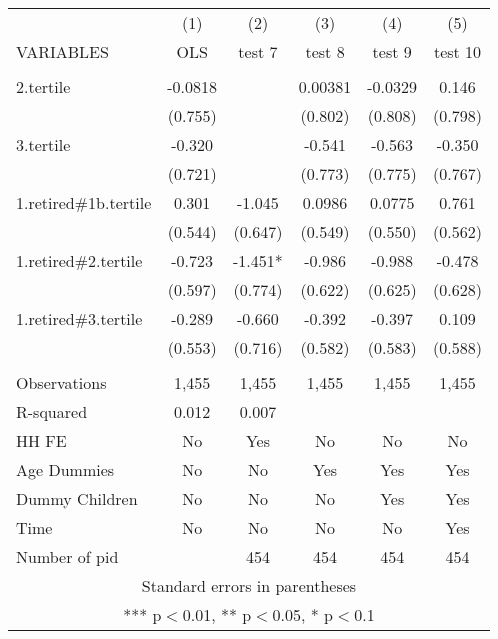 \begin{tabular}{lccccc} \hline
 & (1) & (2) & (3) & (4) & (5) \\
VARIABLES & OLS & test 7 & test 8 & test 9 & test 10 \\ \hline
 &  &  &  &  &  \\
2.tertile & -0.0818 &  & 0.00381 & -0.0329 & 0.146 \\
 & (0.755) &  & (0.802) & (0.808) & (0.798) \\
3.tertile & -0.320 &  & -0.541 & -0.563 & -0.350 \\
 & (0.721) &  & (0.773) & (0.775) & (0.767) \\
1.retired\#1b.tertile & 0.301 & -1.045 & 0.0986 & 0.0775 & 0.761 \\
 & (0.544) & (0.647) & (0.549) & (0.550) & (0.562) \\
1.retired\#2.tertile & -0.723 & -1.451* & -0.986 & -0.988 & -0.478 \\
 & (0.597) & (0.774) & (0.622) & (0.625) & (0.628) \\
1.retired\#3.tertile & -0.289 & -0.660 & -0.392 & -0.397 & 0.109 \\
 & (0.553) & (0.716) & (0.582) & (0.583) & (0.588) \\
 &  &  &  &  &  \\
Observations & 1,455 & 1,455 & 1,455 & 1,455 & 1,455 \\
R-squared & 0.012 & 0.007 &  &  &  \\
HH FE & No & Yes & No & No & No \\
Age Dummies & No & No & Yes & Yes & Yes \\
Dummy Children & No & No & No & Yes & Yes \\
Time & No & No & No & No & Yes \\
 Number of pid &  & 454 & 454 & 454 & 454 \\ \hline
\multicolumn{6}{c}{ Standard errors in parentheses} \\
\multicolumn{6}{c}{ *** p$<$0.01, ** p$<$0.05, * p$<$0.1} \\
\end{tabular}
